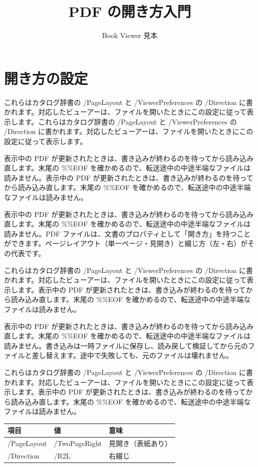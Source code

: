 \documentclass[a5paper,10pt]{ltjsarticle}
\title{PDF の開き方入門}\author{Book Viewer 見本}\date{}
\begin{document}
\maketitle
\section{開き方の設定}
これらはカタログ辞書の /PageLayout と /ViewerPreferences の /Direction に書かれます。対応したビューアーは、ファイルを開いたときにこの設定に従って表示します。これらはカタログ辞書の /PageLayout と /ViewerPreferences の /Direction に書かれます。対応したビューアーは、ファイルを開いたときにこの設定に従って表示します。

表示中の PDF が更新されたときは、書き込みが終わるのを待ってから読み込み直します。末尾の \%\%EOF を確かめるので、転送途中の中途半端なファイルは読みません。表示中の PDF が更新されたときは、書き込みが終わるのを待ってから読み込み直します。末尾の \%\%EOF を確かめるので、転送途中の中途半端なファイルは読みません。

表示中の PDF が更新されたときは、書き込みが終わるのを待ってから読み込み直します。末尾の \%\%EOF を確かめるので、転送途中の中途半端なファイルは読みません。PDF ファイルは、文書のプロパティとして「開き方」を持つことができます。ページレイアウト（単一ページ・見開き）と綴じ方（左・右）がその代表です。

これらはカタログ辞書の /PageLayout と /ViewerPreferences の /Direction に書かれます。対応したビューアーは、ファイルを開いたときにこの設定に従って表示します。表示中の PDF が更新されたときは、書き込みが終わるのを待ってから読み込み直します。末尾の \%\%EOF を確かめるので、転送途中の中途半端なファイルは読みません。

表示中の PDF が更新されたときは、書き込みが終わるのを待ってから読み込み直します。末尾の \%\%EOF を確かめるので、転送途中の中途半端なファイルは読みません。書き込みは一時ファイルに保存し、読み戻して検証してから元のファイルと差し替えます。途中で失敗しても、元のファイルは壊れません。

これらはカタログ辞書の /PageLayout と /ViewerPreferences の /Direction に書かれます。対応したビューアーは、ファイルを開いたときにこの設定に従って表示します。表示中の PDF が更新されたときは、書き込みが終わるのを待ってから読み込み直します。末尾の \%\%EOF を確かめるので、転送途中の中途半端なファイルは読みません。

\begin{center}\begin{tabular}{lll}\hline 項目 & 値 & 意味\\\hline
/PageLayout & /TwoPageRight & 見開き（表紙あり）\\ /Direction & /R2L & 右綴じ\\\hline\end{tabular}\end{center}
\end{document}
